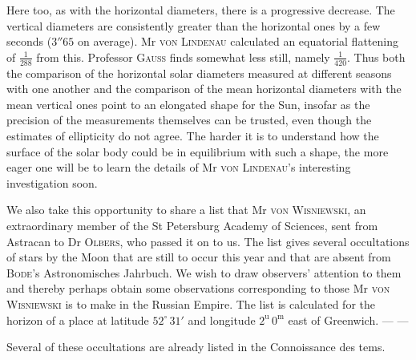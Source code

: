 Here too, as with the horizontal diameters, there is a progressive decrease. The vertical diameters are consistently greater than the horizontal ones by a few seconds ($3''65$ on average). Mr \textsc{von Lindenau} calculated an equatorial flattening of $\tfrac{1}{288}$ from this. Professor \textsc{Gauss} finds somewhat less still, namely $\tfrac{1}{420}$. Thus both the comparison of the horizontal solar diameters measured at different seasons with one another and the comparison of the mean horizontal diameters with the mean vertical ones point to an elongated shape for the Sun, insofar as the precision of the measurements themselves can be trusted, even though the estimates of ellipticity do not agree. The harder it is to understand how the surface of the solar body could be in equilibrium with such a shape, the more eager one will be to learn the details of Mr \textsc{von Lindenau}’s interesting investigation soon.

We also take this opportunity to share a list that Mr \textsc{von Wisniewski}, an extraordinary member of the St Petersburg Academy of Sciences, sent from Astracan to Dr \textsc{Olbers}, who passed it on to us. The list gives several occultations of stars by the Moon that are still to occur this year and that are absent from \textsc{Bode}’s Astronomisches Jahrbuch. We wish to draw observers’ attention to them and thereby perhaps obtain some observations corresponding to those Mr \textsc{von Wisniewski} is to make in the Russian Empire. The list is calculated for the horizon of a place at latitude $52^{\circ}\,31'$ and longitude $2^{\mathrm u}\,0^{\mathrm m}$ east of Greenwich. — —

Several of these occultations are already listed in the Connoissance des tems.
